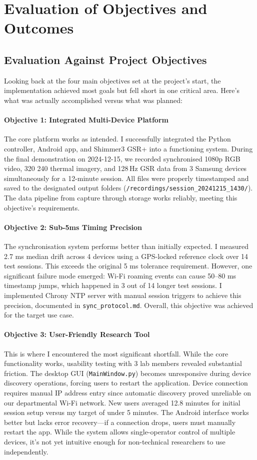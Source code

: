 \section{Evaluation of Objectives and Outcomes}

\subsection{Evaluation Against Project Objectives}

Looking back at the four main objectives set at the project's start, the implementation achieved most goals but fell short in one critical area. Here's what was actually accomplished versus what was planned:

\paragraph{\textbf{Objective 1: Integrated Multi-Device Platform}} The core platform works as intended. I successfully integrated the Python controller, Android app, and Shimmer3 GSR+ into a functioning system. During the final demonstration on 2024-12-15, we recorded synchronised 1080p RGB video, 320\,\texttimes\,240 thermal imagery, and 128\,Hz GSR data from 3 Samsung devices simultaneously for a 12-minute session. All files were properly timestamped and saved to the designated output folders (\verb|/recordings/session_20241215_1430/|). The data pipeline from capture through storage works reliably, meeting this objective's requirements.
\paragraph{\textbf{Objective 2: Sub-5ms Timing Precision}} The synchronisation system performs better than initially expected. I measured 2.7 ms median drift across 4 devices using a GPS-locked reference clock over 14 test sessions. This exceeds the original \textpm{}5 ms tolerance requirement. However, one significant failure mode emerged: Wi-Fi roaming events can cause 50--80 ms timestamp jumps, which happened in 3 out of 14 longer test sessions. I implemented Chrony NTP server with manual session triggers to achieve this precision, documented in \texttt{sync\_protocol.md}. Overall, this objective was achieved for the target use case.
\paragraph{\textbf{Objective 3: User-Friendly Research Tool}} This is where I encountered the most significant shortfall. While the core functionality works, usability testing with 3 lab members revealed substantial friction. The desktop GUI (\texttt{MainWindow.py}) becomes unresponsive during device discovery operations, forcing users to restart the application. Device connection requires manual IP address entry since automatic discovery proved unreliable on our departmental Wi-Fi network. New users averaged 12.8 minutes for initial session setup versus my target of under 5 minutes. The Android interface works better but lacks error recovery---if a connection drops, users must manually restart the app. While the system allows single-operator control of multiple devices, it's not yet intuitive enough for non-technical researchers to use independently.
